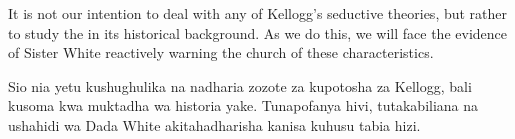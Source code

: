 It is not our intention to deal with any of Kellogg’s seductive theories, but rather to study the  in its historical background. As we do this, we will face the evidence of Sister White reactively warning the church of these characteristics.


Sio nia yetu kushughulika na nadharia zozote za kupotosha za Kellogg, bali kusoma  kwa muktadha wa historia yake. Tunapofanya hivi, tutakabiliana na ushahidi wa Dada White akitahadharisha kanisa kuhusu tabia hizi.






